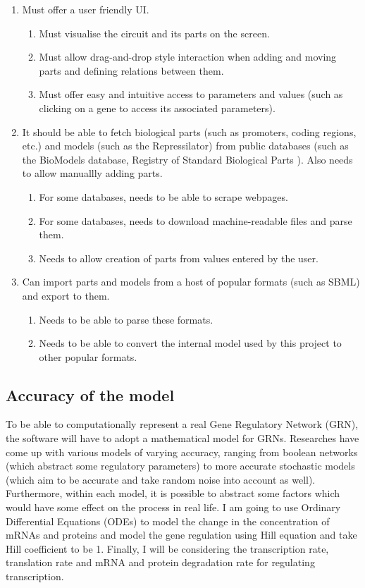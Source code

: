 \documentclass{article}
\begin{document}
\begin{enumerate}
		\item Must offer a user friendly UI.
		\begin{enumerate}
			\item Must visualise the circuit and its parts on the screen.
			\item Must allow drag-and-drop style interaction when adding and moving parts and defining relations between them.
			\item Must offer easy and intuitive access to parameters and values (such as clicking on a gene to access its associated parameters).
		\end{enumerate}
		
		\item It should be able to fetch biological parts (such as promoters, coding regions, etc.) and models (such as the Repressilator) from public databases (such as the BioModels\cite{biomodels} database, Registry of Standard Biological Parts \cite{rsbp}). Also needs to allow manuallly adding parts.
		\begin{enumerate}
			\item For some databases, needs to be able to scrape webpages.
			\item For some databases, needs to download machine-readable files and parse them.
			\item Needs to allow creation of parts from values entered by the user.
		\end{enumerate}
		
		\item Can import parts and models from a host of popular formats (such as SBML) and export to them.
		\begin{enumerate}
			\item Needs to be able to parse these formats.
			\item Needs to be able to convert the internal model used by this project to other popular formats.
		\end{enumerate}
		
	\end{enumerate}
	
	\subsection{Accuracy of the model}
	\par To be able to computationally represent a real Gene Regulatory Network (GRN), the software will have to adopt a mathematical model for GRNs. Researches have come up with various models of varying accuracy, ranging from boolean networks (which abstract some regulatory parameters) 
	to more accurate stochastic models (which aim to be accurate and take random noise into account as well).
	Furthermore, within each model, it is possible to abstract some factors which would have some effect on the process in real life. I am going to use Ordinary Differential Equations (ODEs) 
	to model the change in the concentration of mRNAs and proteins and model the gene regulation using Hill equation
	and take Hill coefficient to be 1. Finally, I will be considering the transcription rate, translation rate and mRNA and protein degradation rate for regulating transcription.
	
\end{document}
